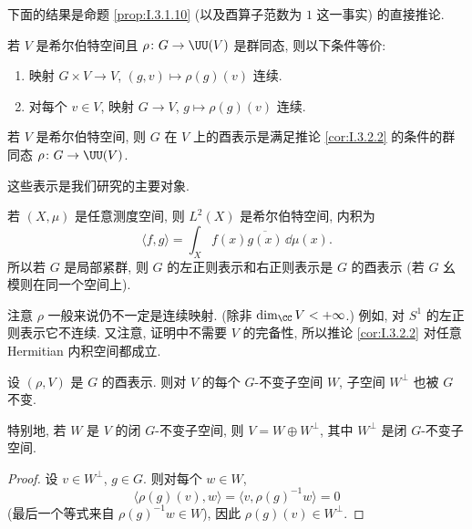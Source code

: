 下面的结果是命题 \ref{prop:I.3.1.10} (以及酉算子范数为 $1$ 这一事实) 的直接推论.

\begin{corollary}[酉表示的等价条件]
\label{cor:I.3.2.2}
若 $V$ 是希尔伯特空间且 $\rho \colon G \to \UU(V)$ 是群同态, 则以下条件等价:
\begin{enumerate}
\item[(1)] 映射 $G \times V \to V$, $(g, v) \longmapsto \rho(g)(v)$ 连续.
\item[(2)] 对每个 $v \in V$, 映射 $G \to V$, $g \longmapsto \rho(g)(v)$ 连续.
\end{enumerate}
\end{corollary}

\begin{definition}
\label{def:I.3.2.3}
若 $V$ 是希尔伯特空间, 则 $G$ 在 $V$ 上的酉表示是满足推论 \ref{cor:I.3.2.2} 的条件的群同态 $\rho \colon G \to \UU(V)$.
\end{definition}

这些表示是我们研究的主要对象.

\begin{example}[$L^2$ 空间上的酉表示]
\label{exa:I.3.2.4}
若 $(X, \mu)$ 是任意测度空间, 则 $L^2(X)$ 是希尔伯特空间, 内积为
\[
\langle f, g \rangle = \int_X f(x)\overline{g(x)} \,\dd\mu(x).
\]
所以若 $G$ 是局部紧群, 则 $G$ 的左正则表示和右正则表示是 $G$ 的酉表示 (若 $G$ 幺模则在同一个空间上).
\end{example}

\begin{remark}
\label{rem:I.3.2.5}
注意 $\rho$ 一般来说仍不一定是连续映射. (除非 $\dim_{\CC}V < +\infty$.) 例如, 对 $S^1$ 的左正则表示它不连续.
又注意, 证明中不需要 $V$ 的完备性, 所以推论 \ref{cor:I.3.2.2} 对任意 Hermitian 内积空间都成立.
\end{remark}

\begin{lemma}[不变子空间的正交补]
\label{lem:I.3.2.6}
设 $(\rho, V)$ 是 $G$ 的酉表示. 则对 $V$ 的每个 $G$-不变子空间 $W$, 子空间 $W^{\perp}$ 也被 $G$ 不变.

特别地, 若 $W$ 是 $V$ 的闭 $G$-不变子空间, 则 $V = W \oplus W^{\perp}$, 其中 $W^{\perp}$ 是闭 $G$-不变子空间.
\end{lemma}

\begin{proof}
设 $v \in W^{\perp}$, $g \in G$. 则对每个 $w \in W$,
\[
\langle \rho(g)(v), w \rangle = \langle v, \rho(g)^{-1}w \rangle = 0
\]
(最后一个等式来自 $\rho(g)^{-1}w \in W$), 因此 $\rho(g)(v) \in W^{\perp}$.
\end{proof}

